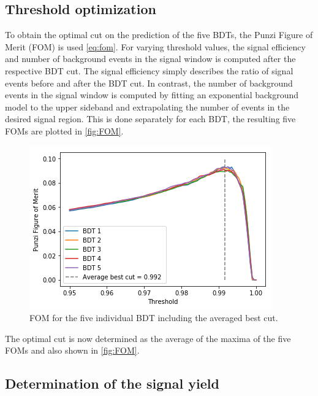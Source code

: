 \subsection{Threshold optimization}

To obtain the optimal cut on the prediction of the five BDTs, the Punzi Figure of Merit (FOM) is used \eqref{eq:fom}.
For varying threshold values, the signal efficiency and number of background events in the signal window is computed after the respective BDT cut.
The signal efficiency simply describes the ratio of signal events before and after the BDT cut. In contrast, the number of background events in the signal
window is computed by fitting an exponential background model to the upper sideband and extrapolating the number of events in the desired signal region.
This is done separately for each BDT, the resulting five FOMs are plotted in \autoref{fig:FOM}.
\begin{figure}[H]
	\centering
	\includegraphics[width=0.6\linewidth]{plots/FOM.png}
	\caption{FOM for the five individual BDT including the averaged best cut.}
	\label{fig:FOM}
\end{figure}
The optimal cut is now determined as the average of the maxima of the five FOMs and also shown in \autoref{fig:FOM}.

\subsection{Determination of the signal yield}

